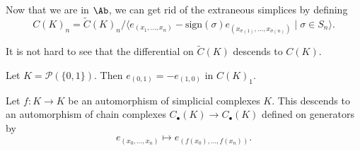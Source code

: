 \documentclass[main.tex]{subfiles}
\begin{document}
Now that we are in $\Ab$, we can get rid of the extraneous simplices by defining
\begin{equation*}
  C(K)_{n} = \widetilde{C}(K)_{n}/\langle e_{(x_{1}, \ldots, x_{n})} - \mathrm{sign}(\sigma) e_{(x_{\sigma(1)}, \ldots, x_{\sigma(n)})} \mid \sigma \in S_{n}\rangle.
\end{equation*}

It is not hard to see that the differential on $\widetilde{C}(K)$ descends to $C(K)$.

\begin{example}
  Let $K = \mathcal{P}(\{0, 1\})$. Then $e_{(0, 1)} = -e_{(1, 0)}$ in $C(K)_{1}$.
\end{example}

Let $f\colon K \to K$ be an automorphism of simplicial complexes $K$. This descends to an automorphism of chain complexes $C_{\bullet}(K) \to C_{\bullet}(K)$ defined on generators by
\begin{equation*}
  e_{(x_{0}, \ldots, x_{n})} \mapsto e_{(f(x_{0}), \ldots, f(x_{n}))}.
\end{equation*}
\end{document}

